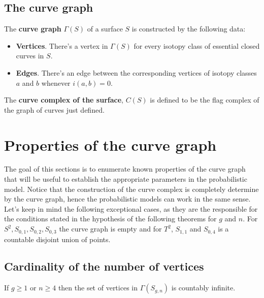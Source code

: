 \subsection{The curve graph}

\begin{defini}
The \textbf{curve graph} $\Gamma(S)$ of a surface $S$ is constructed by the following data:
\begin{itemize}
\item \textbf{Vertices}. There's a vertex in $\Gamma(S)$ for every isotopy class of essential closed curves in $S$.
\item \textbf{Edges}. There's an edge between the corresponding vertices of isotopy classes $a$ and $b$ whenever $i(a,b)=0$.
\end{itemize}
\end{defini}

\begin{defini}
The \textbf{curve complex of the surface}, $C(S)$ is defined to be the flag complex of the graph of curves just defined.
\end{defini}

\section{Properties of the curve graph}
The goal of this sections is to enumerate known properties of the curve graph that will be useful to establish the appropriate parameters in the probabilistic model. Notice that the construction of the curve complex is completely determine by the curve graph, hence the probabilistic models can work in the same sense. Let's keep in mind the following exceptional cases, as they are the responsible for the conditions stated in the hypothesis of the following theorems for $g$ and $n$. For $ S^2, S_{0,1}, S _{0,2}, S_{0,3} $ the curve graph is empty and for  $ T^{2} $, $ S_{1,1}$ and $ S_{0,4}$ is a countable disjoint union of points.

\subsection{Cardinality of the number of vertices}
\begin{theorem}
If $g\geq 1$ or $n\geq 4$ then the set of vertices in $\Gamma(S_{g,n})$ is countably infinite.
\end{theorem}

